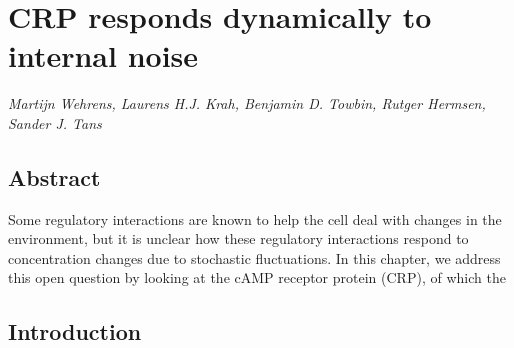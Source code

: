 



% 
%
% 



\chapter{CRP responds dynamically to internal noise}
\label{chapter:CRP}

\textit{Martijn Wehrens, Laurens H.J. Krah, Benjamin D. Towbin, Rutger Hermsen, Sander J. Tans}

\thispagestyle{empty}
\clearpage


\section*{Abstract}

Some regulatory interactions are known to help the cell deal with changes in the environment, but it is unclear how these regulatory interactions respond to concentration changes due to stochastic fluctuations.
%
In this chapter, we address this open question by looking at the cAMP receptor protein (CRP), of which the 

\section{Introduction}



